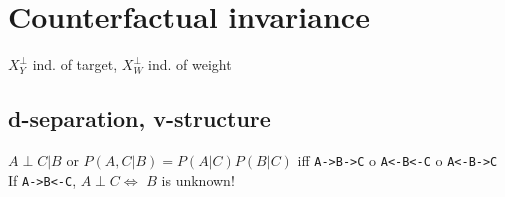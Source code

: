\section*{Counterfactual invariance}
$X^\perp_Y$ ind. of target, $X^\perp_W$ ind. of weight

\subsection*{d-separation, v-structure}
$A \perp C | B$ or $P(A, C|B) = P(A|C)P(B|C)$ iff \texttt{A->B->C} o \texttt{A<-B<-C} o \texttt{A<-B->C}\\
If \texttt{A->B<-C}, $A\perp C \iff$ $B$ is unknown!